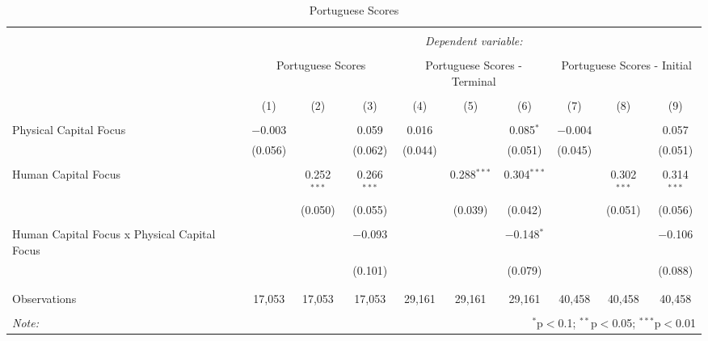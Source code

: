 
\begin{table}[!htbp] \centering 
  \caption{Portuguese Scores} 
  \label{} 
\begin{tabular}{@{\extracolsep{5pt}}lccccccccc} 
\\[-1.8ex]\hline 
\hline \\[-1.8ex] 
 & \multicolumn{9}{c}{\textit{Dependent variable:}} \\ 
\cline{2-10} 
\\[-1.8ex] & \multicolumn{3}{c}{Portuguese Scores} & \multicolumn{3}{c}{Portuguese Scores - Terminal} & \multicolumn{3}{c}{Portuguese Scores - Initial} \\ 
\\[-1.8ex] & (1) & (2) & (3) & (4) & (5) & (6) & (7) & (8) & (9)\\ 
\hline \\[-1.8ex] 
 Physical Capital Focus & $-$0.003 &  & 0.059 & 0.016 &  & 0.085$^{*}$ & $-$0.004 &  & 0.057 \\ 
  & (0.056) &  & (0.062) & (0.044) &  & (0.051) & (0.045) &  & (0.051) \\ 
  & & & & & & & & & \\ 
 Human Capital Focus &  & 0.252$^{***}$ & 0.266$^{***}$ &  & 0.288$^{***}$ & 0.304$^{***}$ &  & 0.302$^{***}$ & 0.314$^{***}$ \\ 
  &  & (0.050) & (0.055) &  & (0.039) & (0.042) &  & (0.051) & (0.056) \\ 
  & & & & & & & & & \\ 
 Human Capital Focus x Physical Capital Focus &  &  & $-$0.093 &  &  & $-$0.148$^{*}$ &  &  & $-$0.106 \\ 
  &  &  & (0.101) &  &  & (0.079) &  &  & (0.088) \\ 
  & & & & & & & & & \\ 
\hline \\[-1.8ex] 
Observations & 17,053 & 17,053 & 17,053 & 29,161 & 29,161 & 29,161 & 40,458 & 40,458 & 40,458 \\ 
\hline 
\hline \\[-1.8ex] 
\textit{Note:}  & \multicolumn{9}{r}{$^{*}$p$<$0.1; $^{**}$p$<$0.05; $^{***}$p$<$0.01} \\ 
\end{tabular} 
\end{table} 
